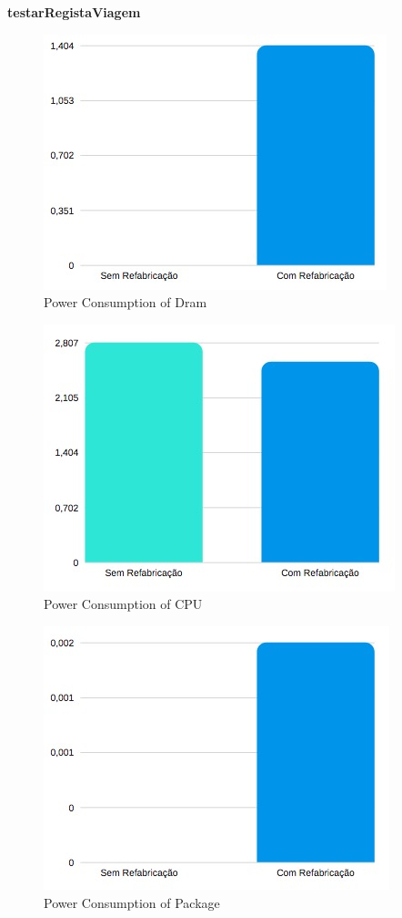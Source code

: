 \textbf{testarRegistaViagem}

\begin{figure}[H]
    \centering
    \includegraphics[scale=0.8]{tex/img/graficos/18.jpg}
    \caption{Power Consumption of Dram}
\end{figure}

\begin{figure}[H]
    \centering
    \includegraphics[scale=0.8]{tex/img/graficos/19.jpg}
    \caption{Power Consumption of CPU}
\end{figure}

\begin{figure}[H]
    \centering
    \includegraphics[scale=0.8]{tex/img/graficos/20.jpg}
    \caption{Power Consumption of Package}
\end{figure}


